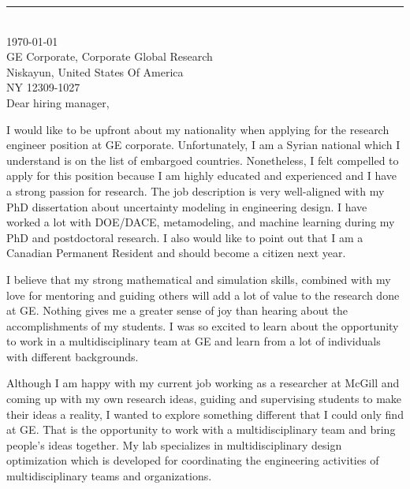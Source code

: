 \documentclass[12pt]{article} %
\begin{document}
\medskip %
\rule[0pt]{\textwidth}{1pt}\\
\today\\[6pt]
GE Corporate, Corporate Global Research\\
Niskayun, United States Of America\\
NY 12309-1027\\[6pt] \medskip
Dear hiring manager,

\medskip %
I would like to be upfront about my nationality when applying for the research engineer position at GE corporate. Unfortunately, I am a Syrian national which I understand is on the list of embargoed countries. Nonetheless, I felt compelled to apply for this position because I am highly educated and experienced and I have a strong passion for research. The job description is very well-aligned with my PhD dissertation about uncertainty modeling in engineering design. I have worked a lot with DOE/DACE, metamodeling, and machine learning during my PhD and postdoctoral research. I also would like to point out that I am a Canadian Permanent Resident and should become a citizen next year. 

\medskip %

I believe that my strong mathematical and simulation skills, combined with my love for mentoring and guiding others will add a lot of value to the research done at GE. Nothing gives me a greater sense of joy than hearing about the accomplishments of my students. I was so excited to learn about the opportunity to work in a multidisciplinary team at GE and learn from a lot of individuals with different backgrounds.

\medskip %

Although I am happy with my current job working as a researcher at McGill and coming up with my own research ideas, guiding and supervising students to make their ideas a reality, I wanted to explore something different that I could only find at GE. That is the opportunity to work with a multidisciplinary team and bring people's ideas together. My lab specializes in multidisciplinary design optimization which is developed for coordinating the engineering activities of multidisciplinary teams and organizations.
\end{document}
